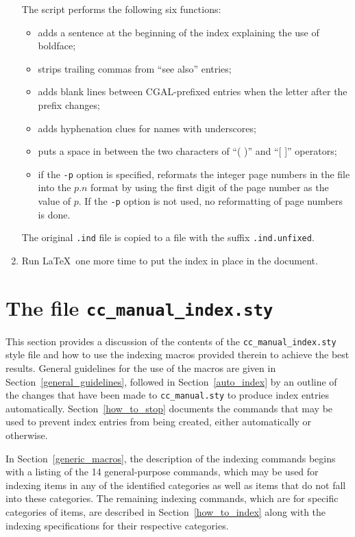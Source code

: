 \documentclass{article}
\begin{document}
\begin{enumerate}
         The script performs the following six functions: 
         \begin{itemize}
            \item adds a sentence at the beginning of the index explaining the 
                  use of boldface;
            \item strips trailing commas from ``see also'' entries;
            \item adds blank lines between CGAL-prefixed entries when the
                  letter after the prefix changes;
            \item adds hyphenation clues for names with underscores;
            \item puts a space in between the two characters of ``( )'' and
                  ``[ ]'' operators;
            \item if the {\tt -p} option is specified, reformats the integer
                  page numbers in the file into the $p.n$ format by using the
                  first digit of the page number as the value of $p$.
                  If the {\tt -p} option is not used, no reformatting of page 
                  numbers is done.
         \end{itemize}
         The original \verb|.ind| file is copied to a file with the suffix
         \verb|.ind.unfixed|.
   \item Run \LaTeX\ one more time to put the index in place in the document.
\end{enumerate}


\section{The file {\tt cc\_manual\_index.sty}}
\label{style_file}

This section provides a discussion of the contents of
the \verb|cc_manual_index.sty| style file and how to use the indexing 
macros provided therein to achieve the best results.
General guidelines for the use of the macros are given
in Section~\ref{general_guidelines}, followed in 
Section~\ref{auto_index} by an outline of the changes that have been made
to \verb|cc_manual.sty| to produce index entries automatically. 
Section~\ref{how_to_stop} documents the commands that may be
used to prevent index entries from being created, either automatically
or otherwise.

In Section~\ref{generic_macros}, the description
of the indexing commands begins with a listing of the 14 general-purpose
commands, which may be used for indexing items in any of
the identified categories as well as items that do not fall into these
categories.  The remaining indexing commands, which are for specific
categories of items, are described in Section~\ref{how_to_index} along 
with the indexing specifications for their respective categories.
\end{document}
